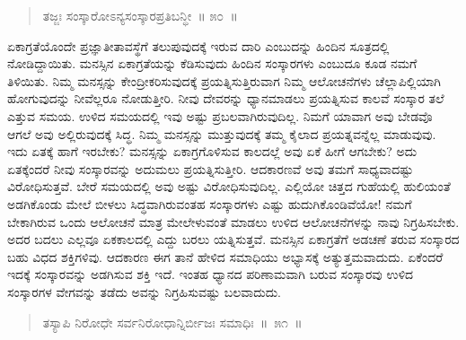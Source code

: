 \vspace{-0.3cm}

\begin{verse}
ತಜ್ಜಃ ಸಂಸ್ಕಾರೋಽನ್ಯಸಂಸ್ಕಾರಪ್ರತಿಬನ್ಧೀ~॥ ೫೦~॥
\end{verse}

\vspace{-0.3cm}


ಏಕಾಗ್ರತೆಯೊಂದೇ ಪ್ರಜ್ಞಾತೀತಾವಸ್ಥೆಗೆ ತಲುಪುವುದಕ್ಕೆ ಇರುವ ದಾರಿ ಎಂಬುದನ್ನು ಹಿಂದಿನ ಸೂತ್ರದಲ್ಲಿ ನೋಡಿದ್ದಾಯಿತು. ಮನಸ್ಸಿನ ಏಕಾಗ್ರತೆಯನ್ನು ಕೆಡಿಸುವುದು ಹಿಂದಿನ ಸಂಸ್ಕಾರಗಳು ಎಂಬುದೂ ಕೂಡ ನಮಗೆ ತಿಳಿಯಿತು. ನಿಮ್ಮ ಮನಸ್ಸನ್ನು ಕೇಂದ್ರೀಕರಿಸುವುದಕ್ಕೆ ಪ್ರಯತ್ನಿಸುತ್ತಿರುವಾಗ ನಿಮ್ಮ ಆಲೋಚನೆಗಳು ಚೆಲ್ಲಾಪಿಲ್ಲಿಯಾಗಿ ಹೋಗುವುದನ್ನು ನೀವೆಲ್ಲರೂ ನೋಡುತ್ತೀರಿ. ನೀವು ದೇವರನ್ನು ಧ್ಯಾನಮಾಡಲು ಪ್ರಯತ್ನಿಸುವ ಕಾಲವೆ ಸಂಸ್ಕಾರ ತಲೆ ಎತ್ತುವ ಸಮಯ. ಉಳಿದ ಸಮಯದಲ್ಲಿ ಇವು ಅಷ್ಟು ಪ್ರಬಲವಾಗಿರುವುದಿಲ್ಲ. ನಿಮಗೆ ಯಾವಾಗ ಅವು ಬೇಡವೊ ಆಗಲೆ ಅವು ಅಲ್ಲಿರುವುದಕ್ಕೆ ಸಿದ್ಧ. ನಿಮ್ಮ ಮನಸ್ಸನ್ನು ಮುತ್ತುವುದಕ್ಕೆ ತಮ್ಮ ಕೈಲಾದ ಪ್ರಯತ್ನವನ್ನೆಲ್ಲ ಮಾಡುವುವು. ಇದು ಏತಕ್ಕೆ ಹಾಗೆ ಇರಬೇಕು? ಮನಸ್ಸನ್ನು ಏಕಾಗ್ರಗೊಳಿಸುವ ಕಾಲದಲ್ಲೆ ಅವು ಏಕೆ ಹೀಗೆ ಆಗಬೇಕು? ಅದು ಏತಕ್ಕೆಂದರೆ ನೀವು ಸಂಸ್ಕಾರವನ್ನು ಅದುಮಲು ಪ್ರಯತ್ನಿಸುತ್ತೀರಿ. ಆದಕಾರಣವೆ ಅವು ತಮಗೆ ಸಾಧ್ಯವಾದಷ್ಟು ವಿರೋಧಿಸುತ್ತವೆ. ಬೇರೆ ಸಮಯದಲ್ಲಿ ಅವು ಅಷ್ಟು ವಿರೋಧಿಸುವುದಿಲ್ಲ. ಎಲ್ಲಿಯೋ ಚಿತ್ತದ ಗುಹೆಯಲ್ಲಿ ಹುಲಿಯಂತೆ ಅಡಗಿಕೊಂಡು ಮೇಲೆ ಬೀಳಲು ಸಿದ್ಧವಾಗಿರುವಂತಹ ಸಂಸ್ಕಾರಗಳು ಎಷ್ಟು ಹುದುಗಿಕೊಂಡಿವೆಯೋ! ನಮಗೆ ಬೇಕಾಗಿರುವ ಒಂದು ಆಲೋಚನೆ ಮಾತ್ರ ಮೇಲೇಳುವಂತೆ ಮಾಡಲು ಉಳಿದ ಆಲೋಚನೆಗಳನ್ನು ನಾವು ನಿಗ್ರಹಿಸಬೇಕು. ಅದರ ಬದಲು ಎಲ್ಲವೂ ಏಕಕಾಲದಲ್ಲಿ ಎದ್ದು ಬರಲು ಯತ್ನಿಸುತ್ತವೆ. ಮನಸ್ಸಿನ ಏಕಾಗ್ರತೆಗೆ ಅಡಚಣೆ ತರುವ ಸಂಸ್ಕಾರದ ಬಹು ವಿಧದ ಶಕ್ತಿಗಳಿವು. ಆದಕಾರಣ ಈಗ ತಾನೆ ಹೇಳಿದ ಸಮಾಧಿಯು ಅಭ್ಯಾಸಕ್ಕೆ ಅತ್ಯುತ್ತಮವಾದುದು. ಏಕೆಂದರೆ ಇದಕ್ಕೆ ಸಂಸ್ಕಾರವನ್ನು ಅಡಗಿಸುವ ಶಕ್ತಿ ಇದೆ. ಇಂತಹ ಧ್ಯಾನದ ಪರಿಣಾಮವಾಗಿ ಬರುವ ಸಂಸ್ಕಾರವು ಉಳಿದ ಸಂಸ್ಕಾರಗಳ ವೇಗವನ್ನು ತಡೆದು ಅವನ್ನು ನಿಗ್ರಹಿಸುವಷ್ಟು ಬಲವಾದುದು. 

\vspace{-0.3cm}

\begin{verse}
ತಸ್ಯಾಪಿ ನಿರೋಧೇ ಸರ್ವನಿರೋಧಾನ್ನಿರ್ಬೀಜಃ ಸಮಾಧಿಃ~॥~೫೧~॥
\end{verse}

\vspace{-0.3cm}


